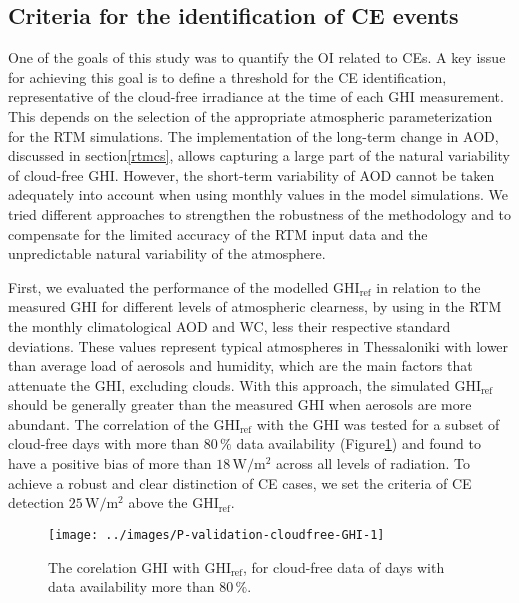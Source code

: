 \documentclass[preprint, 5p,
authoryear]{elsarticle} %
\begin{document}
\hypertarget{criteria-for-the-identification-of-ce-events}{%
\subsection{Criteria for the identification of CE
events}\label{criteria-for-the-identification-of-ce-events}}

One of the goals of this study was to quantify the OI related to CEs. A
key issue for achieving this goal is to define a threshold for the CE
identification, representative of the cloud-free irradiance at the time
of each GHI measurement. This depends on the selection of the
appropriate atmospheric parameterization for the RTM simulations. The
implementation of the long-term change in AOD, discussed in
section\nobreakspace{}\ref{rtmcs}, allows capturing a large part of the
natural variability of cloud-free GHI. However, the short-term
variability of AOD cannot be taken adequately into account when using
monthly values in the model simulations. We tried different approaches
to strengthen the robustness of the methodology and to compensate for
the limited accuracy of the RTM input data and the unpredictable natural
variability of the atmosphere.

First, we evaluated the performance of the modelled
\(\text{GHI}_\text{ref}\) in relation to the measured GHI for different
levels of atmospheric clearness, by using in the RTM the monthly
climatological AOD and WC, less their respective standard deviations.
These values represent typical atmospheres in Thessaloniki with lower
than average load of aerosols and humidity, which are the main factors
that attenuate the GHI, excluding clouds. With this approach, the
simulated \(\text{GHI}_\text{ref}\) should be generally greater than the
measured GHI when aerosols are more abundant. The correlation of the
\(\text{GHI}_\text{ref}\) with the GHI was tested for a subset of
cloud-free days with more than \(80\,\%\) data availability
(Figure\nobreakspace{}\ref{fig:validation-GHI}) and found to have a
positive bias of more than \(18\,\text{W}/\text{m}^2\) across all levels
of radiation. To achieve a robust and clear distinction of CE cases, we
set the criteria of CE detection \(25\,\text{W}/\text{m}^2\) above the
\(\text{GHI}_\text{ref}\).

\begin{figure}[H]

{\centering \texttt{[image: ../images/P-validation-cloudfree-GHI-1]} 

}

\caption{The corelation GHI with $\text{GHI}_\text{ref}$, for cloud-free data of days with data availability more than $80\,\%$.}\label{fig:validation-GHI}
\end{figure}
\end{document}
